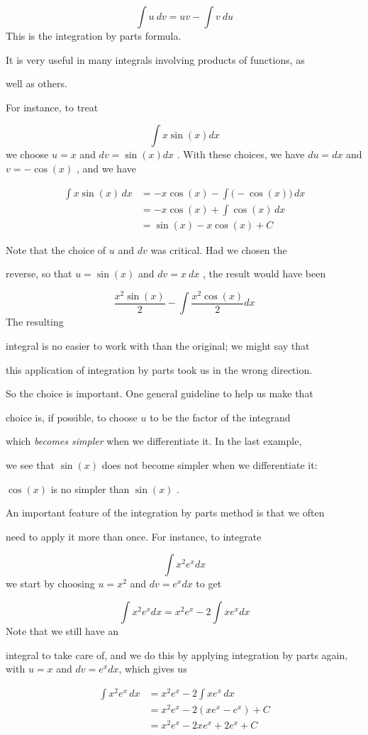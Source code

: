 \[
\int u\ dv=uv-\int v\ du
\] This is the integration by parts formula.

It is very useful in many integrals involving products of functions, as

well as others.


For instance, to treat


\[
\int x\sin(x)dx
\] we choose $u=x$ and $dv=\sin(x)dx$ . With these choices, we have $du=dx$ and $v=-\cos(x)$ , and we have


\begin{align}
\int x\sin(x)\,dx &= -x\cos(x) - \int\big(-\cos(x)\big)\,dx \\&= -x\cos(x) + \int\cos(x)\,dx \\&= \sin(x) - x\cos(x) + C
\end{align}


Note that the choice of $u$ and $dv$ was critical. Had we chosen the

reverse, so that $u=\sin(x)$ and $dv=x\ dx$ , the result would have been


\[
\frac{x^2\sin(x)}{2}-\int\frac{x^2\cos(x)}{2}dx
\] The resulting

integral is no easier to work with than the original; we might say that

this application of integration by parts took us in the wrong direction.


So the choice is important. One general guideline to help us make that

choice is, if possible, to choose $u$ to be the factor of the integrand

which \textit{becomes simpler} when we differentiate it. In the last example,

we see that $\sin(x)$ does not become simpler when we differentiate it:

$\cos(x)$ is no simpler than $\sin(x)$ .


An important feature of the integration by parts method is that we often

need to apply it more than once. For instance, to integrate


\[
\int x^2e^xdx
\] we start by choosing $u=x^2$ and $dv=e^xdx$ to get


\[
\int x^2e^xdx=x^2e^x-2\int xe^xdx
\] Note that we still have an

integral to take care of, and we do this by applying integration by parts again, with $u=x$ and $dv=e^xdx$, which gives us


\begin{align}
\int x^2e^x\,dx &= x^2e^x - 2\int xe^x\,dx \\&= x^2e^x - 2(xe^x - e^x) + C \\&= x^2e^x - 2xe^x + 2e^x + C
\end{align}


